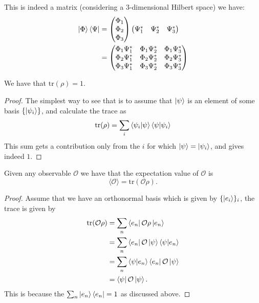 \documentclass[12pt, a4paper]{article}
\begin{document}
\begin{mdremark}
    This is indeed a matrix (considering a \(3\)-dimensional Hilbert space) we have:
    \[\begin{aligned}
        \ket{\Phi}\bra{\Psi} &=
    \begin{pmatrix}
    \Phi_1 \\
    \Phi_2 \\
    \Phi_3
    \end{pmatrix}
    \begin{pmatrix}
    \Psi_1^* & \Psi_2^* & \Psi_3^*
    \end{pmatrix} \\
    &=
    \begin{pmatrix}
    \Phi_1 \Psi_1^* & \Phi_1 \Psi_2^* & \Phi_1 \Psi_3^* \\
    \Phi_2 \Psi_1^* & \Phi_2 \Psi_2^* & \Phi_2 \Psi_3^* \\
    \Phi_3 \Psi_1^* & \Phi_3 \Psi_2^* & \Phi_3 \Psi_3^*
    \end{pmatrix}
    \end{aligned}
\]
\end{mdremark}

\begin{proposition}
    We have that \(\text{tr}(\rho)=1\).
\end{proposition}

\begin{proof}
    The simplest way to see that is to assume that \( \ket{\psi} \) is an element of some basis \( \{\ket{\psi_i}\} \), and calculate the trace as
    \[
    \text{tr}(\rho) = \sum_i \bra{\psi_i}\ket{\psi}\bra{\psi}\ket{\psi_i}
    \]
    This sum gets a contribution only from the \( i \) for which \( \ket{\psi} = \ket{\psi_i} \), and gives indeed \( 1 \).    
\end{proof}

\begin{mdprop}
    Given any observable \(\mathcal{O}\) we have that the expectation value of \(\mathcal{O}\) is 
    \[\langle \mathcal{O} \rangle = \text{tr}(\mathcal{O}\rho).\]
\end{mdprop}

\begin{proof}
    Assume that we have an orthonormal basis which is given by \(\{\ket{e_i}\}_i\), the trace is given by 
    \[\begin{aligned}
        \text{tr}(\mathcal{O}\rho) &=\sum_n \bra{e_n} \mathcal{O}\rho \ket{e_n} \\
        &= \sum_n \bra{e_n} \mathcal{O} \ket{\psi} \bra{\psi} \ket{e_n} \\
        &= \sum_n \bra{\psi} \ket{e_n} \bra{e_n} \mathcal{O} \ket{\psi} \\
        &= \bra{\psi}\mathcal{O}\ket{\psi}.
    \end{aligned}\]
    This is because the \(\sum_n \ket{e_n}\bra{e_n}=1\) as discussed above.
\end{proof}
\end{document}
